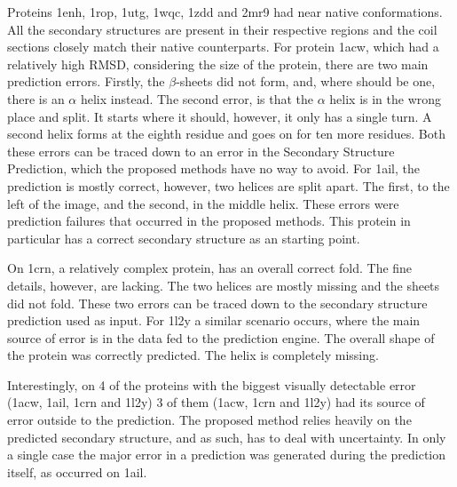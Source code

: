 Proteins 1enh, 1rop, 1utg, 1wqc, 1zdd and 2mr9 had near native conformations.
All the secondary structures are present in their respective regions and the
coil sections closely match their native counterparts.
For protein 1acw,
which had a relatively high RMSD, considering the size of the protein, there are
two main prediction errors. Firstly, the $\beta$-sheets did not form, and, where
should be one, there is an $\alpha$ helix instead. The second error, is that the
$\alpha$ helix is in the wrong place and split. It starts where it should,
however, it only has a single turn. A second helix forms at the eighth residue
and goes on for ten more residues. Both these errors can be traced down to an
error in the Secondary Structure Prediction, which the proposed methods have no
way to avoid. For 1ail, the prediction is mostly correct, however, two helices
are split apart. The first, to the left of the image, and the second, in the
middle helix. These errors were prediction failures that occurred in the proposed methods.
This protein in particular has a correct secondary structure as an starting
point.

On 1crn, a relatively complex protein, has an overall correct fold. The fine
details, however, are lacking. The two helices are mostly missing and the
sheets did not fold. These two errors can be traced down to the secondary
structure prediction used as input. For 1l2y a similar scenario occurs, where
the main source of error is in the data fed to the prediction engine. The
overall shape of the protein was correctly predicted. The helix is completely
missing.

Interestingly, on 4 of the proteins with the biggest visually detectable error
(1acw, 1ail, 1crn and 1l2y)
3 of them (1acw, 1crn and 1l2y) had its source of error outside to the prediction. The proposed method
relies heavily on the predicted secondary structure, and as such, has to deal
with uncertainty. In only a single case the major error in a prediction was
generated during the prediction itself, as occurred on 1ail.
